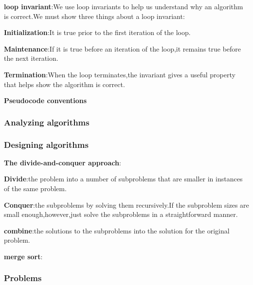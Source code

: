 \documentclass[UTF8,a4paper,12pt]{ctexart}
\begin{document}
                \textbf{loop invariant}:We use loop invariants to help us understand why an algorithm is correct.We must show three things about a loop invariant:

                \textbf{Initialization}:It is true prior to the first iteration of the loop.

                \textbf{Maintenance}:If it is true before an iteration of the loop,it remains true before the next iteration.

                \textbf{Termination}:When the loop terminates,the invariant gives a useful property that helps show the algorithm is correct.

                \textbf{Pseudocode conventions}
            \subsubsection{Analyzing algorithms}
            \subsubsection{Designing algorithms}
                \textbf{The divide-and-conquer approach}:
                
                \textbf{Divide}:the problem into a number of subproblems that are smaller in instances of the same problem.

                \textbf{Conquer}:the subproblems by solving them recursively.If the subproblem sizes are small enough,however,just solve the subproblems in a straightforward manner.

                \textbf{combine}:the solutions to the subproblems into the solution for the original problem.

                \textbf{merge sort}:
            \subsubsection{Problems}      
\end{document}
